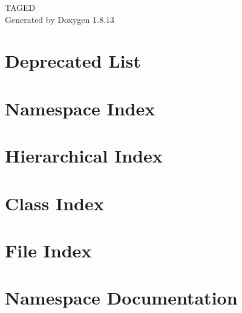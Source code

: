 \documentclass[twoside]{book}
\newcommand{\+}{\discretionary{\mbox{\scriptsize$\hookleftarrow$}}{}{}}
\newcommand{\clearemptydoublepage}{%
  \newpage{\pagestyle{empty}\cleardoublepage}%
}
\begin{document}
\hypersetup{pageanchor=false,
             bookmarksnumbered=true,
             pdfencoding=unicode
            }
\begin{titlepage}
\vspace*{7cm}
\begin{center}%
{\Large T\+A\+G\+ED }\\
\vspace*{1cm}
{\large Generated by Doxygen 1.8.13}\\
\end{center}
\end{titlepage}
\clearemptydoublepage
{}
\tableofcontents
\clearemptydoublepage
{}
\hypersetup{pageanchor=true}

\chapter{Deprecated List}
\label{deprecated}

\chapter{Namespace Index}

\chapter{Hierarchical Index}

\chapter{Class Index}

\chapter{File Index}

\chapter{Namespace Documentation}


\end{document}
